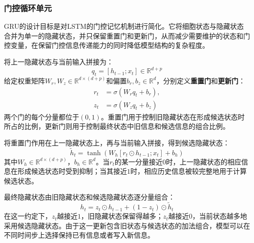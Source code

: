 \subsubsection{门控循环单元}
\gls{GRU}的设计目标是对LSTM的门控记忆机制进行简化。它将细胞状态与隐藏状态合并为单一的隐藏状态，并只保留重置门和更新门，从而减少需要维护的状态和门控变量，在保留门控信息传递能力的同时降低模型结构的复杂程度。\par
将上一隐藏状态与当前输入拼接为：
\begin{equation*}
	q_t=[h_{t-1};x_t]\in\mathbb{R}^{d+p}
\end{equation*}
给定权重矩阵$W_r,W_z\in\mathbb{R}^{d\times(d+p)}$和偏置$b_r,b_z\in\mathbb{R}^d$，分别定义\textbf{重置门}和\textbf{更新门}：
\begin{align*}
	r_t&=\sigma(W_rq_t+b_r),\\
	z_t&=\sigma(W_zq_t+b_z)
\end{align*}
两个门的每个分量都位于$(0,1)$。重置门用于控制旧隐藏状态在形成候选状态时所占的比例，更新门则用于控制最终状态中旧信息和候选信息的组合比例。\par
将重置门作用在上一隐藏状态上，再与当前输入拼接，得到候选隐藏状态：
\begin{equation*}
	\widetilde{h}_t=\tanh\left(W_h[r_t\odot h_{t-1};x_t]+b_h\right)
\end{equation*}
其中$W_h\in\mathbb{R}^{d\times(d+p)}$，$b_h\in\mathbb{R}^d$。当$r_t$的某一分量接近$0$时，上一隐藏状态的相应信息在形成候选状态时受到抑制；当其接近$1$时，相应历史信息被较完整地用于计算候选状态。\par
最终隐藏状态由旧隐藏状态和候选隐藏状态逐分量组合：
\begin{equation*}
	h_t=z_t\odot h_{t-1}+(1-z_t)\odot\widetilde{h}_t
\end{equation*}
在这一约定下，$z_t$越接近$1$，旧隐藏状态保留得越多；$z_t$越接近$0$，当前状态越多地采用候选隐藏状态。由于这一更新包含旧状态与候选状态的加法组合，模型可以在不同时间步上选择保持已有信息或者写入新信息。
